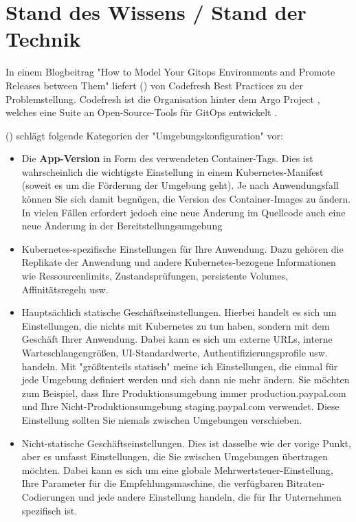 \chapter{Stand des Wissens / Stand der Technik}


In einem Blogbeitrag
"How to Model Your Gitops Environments and Promote Releases between Them"
liefert
\citeauthor{codefreshHowToModelGitOpsEnvironmentsAndPromote} (\citeyear{codefreshHowToModelGitOpsEnvironmentsAndPromote})
von Codefresh
Best Practices zu der Problemstellung.
Codefresh ist die Organisation hinter dem Argo Project
\autocite{argoProjWebsite},
welches eine Suite an Open-Source-Tools für GitOps
entwickelt
\autocite{codefreshHowToModelGitOpsEnvironmentsAndPromote}.

\citeauthor{codefreshHowToModelGitOpsEnvironmentsAndPromote} (\citeyear{codefreshHowToModelGitOpsEnvironmentsAndPromote})
schlägt folgende Kategorien der "Umgebungskonfiguration" vor:

\begin{itemize}
    \item Die \textbf{App-Version} in Form des verwendeten Container-Tags. Dies ist wahrscheinlich die wichtigste Einstellung in einem Kubernetes-Manifest (soweit es um die Förderung der Umgebung geht). Je nach Anwendungsfall können Sie sich damit begnügen, die Version des Container-Images zu ändern. In vielen Fällen erfordert jedoch eine neue Änderung im Quellcode auch eine neue Änderung in der Bereitstellungsumgebung
    \item Kubernetes-spezifische Einstellungen für Ihre Anwendung. Dazu gehören die Replikate der Anwendung und andere Kubernetes-bezogene Informationen wie Ressourcenlimits, Zustandsprüfungen, persistente Volumes, Affinitätsregeln usw.
    \item Hauptsächlich statische Geschäftseinstellungen. Hierbei handelt es sich um Einstellungen, die nichts mit Kubernetes zu tun haben, sondern mit dem Geschäft Ihrer Anwendung. Dabei kann es sich um externe URLs, interne Warteschlangengrößen, UI-Standardwerte, Authentifizierungsprofile usw. handeln. Mit "größtenteils statisch" meine ich Einstellungen, die einmal für jede Umgebung definiert werden und sich dann nie mehr ändern. Sie möchten zum Beispiel, dass Ihre Produktionsumgebung immer production.paypal.com und Ihre Nicht-Produktionsumgebung staging.paypal.com verwendet. Diese Einstellung sollten Sie niemals zwischen Umgebungen verschieben.
    \item Nicht-statische Geschäftseinstellungen. Dies ist dasselbe wie der vorige Punkt, aber es umfasst Einstellungen, die Sie zwischen Umgebungen übertragen möchten. Dabei kann es sich um eine globale Mehrwertsteuer-Einstellung, Ihre Parameter für die Empfehlungsmaschine, die verfügbaren Bitraten-Codierungen und jede andere Einstellung handeln, die für Ihr Unternehmen spezifisch ist.
\end{itemize}




